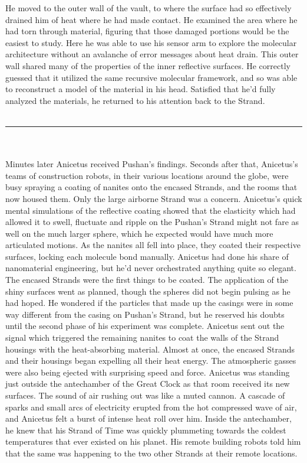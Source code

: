 \documentclass[a4paper]{article}
\begin{document}
He moved to the outer wall of the vault, to where the surface had so effectively drained him of heat where he had made contact. He examined the area where he had torn through material, figuring that those damaged portions would be the easiest to study.
Here he was able to use his sensor arm to explore the molecular architecture without an avalanche of error messages about heat drain. This outer wall shared many of the properties of the inner reflective surfaces. He correctly guessed that it utilized the same recursive molecular framework, and so was able to reconstruct a model of the material in his head. Satisfied that he’d fully analyzed the materials, he returned to his attention back to the Strand. \\ \\

\hrule ~ \\ \\

Minutes later Anicetus received Pushan’s findings. Seconds after that, Anicetus’s teams of construction robots, in their various locations around the globe, were busy spraying a coating of nanites onto the encased Strands, and the rooms that now housed them. Only the large airborne Strand was a concern. Anicetus’s quick mental simulations of the reflective coating showed that the elasticity which had allowed it to swell, fluctuate and ripple on the Pushan’s Strand might not fare as well on the much larger sphere, which he expected would have much more articulated motions.
As the nanites all fell into place, they coated their respective surfaces, locking each molecule bond manually. Anicetus had done his share of nanomaterial engineering, but he’d never orchestrated anything quite so elegant. The encased Strands were the first things to be coated. The application of the shiny surfaces went as planned, though the spheres did not begin pulsing as he had hoped. He wondered if the particles that made up the casings were in some way different from the casing on Pushan’s Strand, but he reserved his doubts until the second phase of his experiment was complete. Anicetus sent out the signal which triggered the remaining nanites to coat the walls of the Strand housings with the heat-absorbing material.
Almost at once, the encased Strands and their housings began expelling all their heat energy. The atmospheric gasses were also being ejected with surprising speed and force. Anicetus was standing just outside the antechamber of the Great Clock as that room received its new surfaces. The sound of air rushing out was like a muted cannon. A cascade of sparks and small arcs of electricity erupted from the hot compressed wave of air, and Anicetus felt a burst of intense heat roll over him. Inside the antechamber, he knew that his Strand of Time was quickly plummeting towards the coldest temperatures that ever existed on his planet. His remote building robots told him that the same was happening to the two other Strands at their remote locations.
\end{document}
